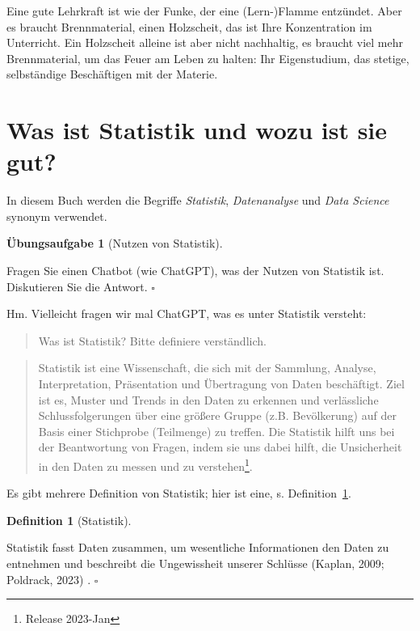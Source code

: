 \documentclass[
  letterpaper,
]{scrbook}
\theoremstyle{definition}
\newtheorem{exercise}{Übungsaufgabe}[chapter]
\theoremstyle{definition}
\theoremstyle{definition}
\newtheorem{definition}{Definition}[chapter]
\theoremstyle{remark}
\begin{document}
Eine gute Lehrkraft ist wie der Funke, der eine (Lern-)Flamme entzündet.
Aber es braucht Brennmaterial, einen Holzscheit, das ist Ihre
Konzentration im Unterricht. Ein Holzscheit alleine ist aber nicht
nachhaltig, es braucht viel mehr Brennmaterial, um das Feuer am Leben zu
halten: Ihr Eigenstudium, das stetige, selbständige Beschäftigen mit der
Materie.

\section{Was ist Statistik und wozu ist sie
gut?}\label{was-ist-statistik-und-wozu-ist-sie-gut}

In diesem Buch werden die Begriffe \emph{Statistik}, \emph{Datenanalyse}
und \emph{Data Science} synonym verwendet.

\begin{exercise}[Nutzen von
Statistik]\protect\hypertarget{exr-nutzen-statistik}{}\label{exr-nutzen-statistik}

Fragen Sie einen Chatbot (wie ChatGPT), was der Nutzen von Statistik
ist. Diskutieren Sie die Antwort. \(\square\)

\end{exercise}

Hm. Vielleicht fragen wir mal ChatGPT, was es unter Statistik versteht:

\begin{quote}
{} Was ist Statistik? Bitte definiere verständlich.
\end{quote}

\begin{quote}
{} Statistik ist eine Wissenschaft, die sich mit der
Sammlung, Analyse, Interpretation, Präsentation und Übertragung von
Daten beschäftigt. Ziel ist es, Muster und Trends in den Daten zu
erkennen und verlässliche Schlussfolgerungen über eine größere Gruppe
(z.B. Bevölkerung) auf der Basis einer Stichprobe (Teilmenge) zu
treffen. Die Statistik hilft uns bei der Beantwortung von Fragen, indem
sie uns dabei hilft, die Unsicherheit in den Daten zu messen und zu
verstehen\footnote{Release 2023-Jan}.
\end{quote}

Es gibt mehrere Definition von Statistik; hier ist eine, s.
Definition~\ref{def-statistik}.

\begin{definition}[Statistik]\protect\hypertarget{def-statistik}{}\label{def-statistik}

Statistik fasst Daten zusammen, um wesentliche Informationen den Daten
zu entnehmen und beschreibt die Ungewissheit unserer Schlüsse (Kaplan,
2009; Poldrack, 2023) . \(\square\)

\end{definition}
\end{document}
